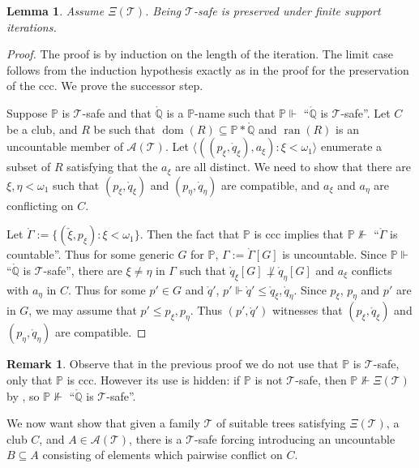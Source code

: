 \documentclass[a4paper,noamsfonts]{amsart}
\newtheorem{lemma}[theorem]{Lemma}
\theoremstyle{definition}
\newtheorem{remark}[theorem]{Remark}
\renewcommand{\P}{\mathbb {P}}
\newcommand{\Q}{\mathbb{Q}}
\newcommand{\seb}{\subseteq}
\newcommand{\tup}[1]{\langle#1\rangle}
\newcommand{\dt}[1]{\mathring{#1}}
\newcommand{\forces}{\Vdash}
\newcommand{\ck}[1]{\check{#1}}
\newcommand{\1}{\mathbf{1}}
\newcommand{\T}{\mathcal{T}}
\newcommand{\prop}{\Xi}
\DeclareMathOperator{\dom}{dom}
\DeclareMathOperator{\ran}{ran}
\begin{document}
\begin{lemma}\label{lem:safe-iterations}
  Assume $\prop(\T)$.
  Being $\T$-safe is preserved under finite support iterations.
\end{lemma}
\begin{proof}
  The proof is by induction on the length of the iteration.
  The limit case follows from the induction hypothesis exactly as in
  the proof for the preservation of the ccc. We prove the successor step.
  
  Suppose $\P$ is $\T$-safe and that $\dt{\Q}$ is a $\P$-name such that
  $\P \forces$ ``$\dt{\Q}$ is $\T$-safe''. Let
  $C$ be a club, and $R$ be such that $\dom(R) \seb \P*\dt{\Q}$
  and $\ran(R)$ is an uncountable member of $\mathcal{A}(\T)$.
  Let $\tup{((p_{\xi},\dt{q}_{\xi}),a_{\xi} ) : \xi < \omega_{1}}$
  enumerate a subset of $R$ satisfying that the $a_{\xi}$ are all distinct.
  We need to show that there are $\xi,\eta < \omega_{1}$ such that
  $(p_{\xi},\dt{q}_{\xi})$ and $(p_{\eta},\dt{q}_{\eta})$ are compatible,
  and $a_{\xi}$ and $a_{\eta}$ are conflicting on $C$.

  Let
  $\dt{\Gamma} := \{(\ck{\xi},p_{\xi}) : \xi < \omega_{1}\}$. Then
  the fact that $\P$ is ccc implies that $\P \not\forces$ ``$\dt{\Gamma}$
  is countable''. Thus for some  generic $G$ for $\P$,
  $\Gamma := \dt{\Gamma}[G]$ is
  uncountable. Since $\P \forces$ ``$\dt{\Q}$ is $\T$-safe'',
  there are $\xi \neq \eta$ in $\Gamma$
  such that $\dt{q}_{\xi}[G] \not\perp \dt{q}_{\eta}[G]$
  and $a_{\xi}$ conflicts with $a_{\eta}$ in $C$.
  Thus for some  $p' \in G$ and $\dt{q}'$,
  $p' \forces \dt{q}' \le \dt{q}_{\xi},\dt{q}_{\eta}$. Since $p_{\xi}$,
  $p_{\eta}$ and $p'$ are in $G$, we may assume that
  $p' \le p_{\xi},p_{\eta}$. Thus $(p',\dt{q}')$ witnesses that
  $(p_{\xi},\dt{q}_{\xi})$ and $(p_{\eta},\dt{q}_{\eta})$ are compatible.
\end{proof}

\begin{remark}
  Observe that in the previous proof we do not use that $\P$ is
  $\T$-safe, only that $\P$ is ccc. However its use is hidden:
  if $\P$ is not
  $\T$-safe, then $\P \not\forces \prop(\T)$ by
  , so
  $\P \not\forces$ ``$\dt{\Q}$ is $\T$-safe''.
\end{remark}

We now want show that given a family $\T$ of suitable trees
satisfying $\prop(\T)$, a club $C$, and $A \in \mathcal{A}(\T)$, there
is a $\T$-safe forcing introducing an uncountable $B \seb A$
consisting of elements which pairwise conflict on $C$.
\end{document}
